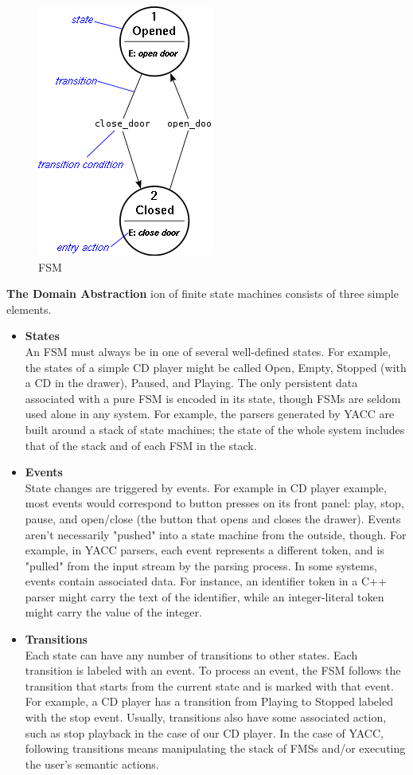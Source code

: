 \begin{figure}[htbp]
    \centering
    \includegraphics[scale=0.8]{images/fsm.png}
    \caption[FSM]{FSM}
\end{figure}

\textbf{The Domain Abstraction} ion of finite state machines consists of three simple elements.
\begin{itemize}
\item \textbf{States}\\
    An FSM must always be in one of several well-defined states. For example,
    the states of a simple CD player might be called Open, Empty, Stopped (with
    a CD in the drawer), Paused, and Playing. The only persistent data
    associated with a pure FSM is encoded in its state, though FSMs are seldom
    used alone in any system. For example, the parsers generated by YACC are
    built around a stack of state machines; the state of the whole system includes
    that of the stack and of each FSM in the stack.
\item \textbf{Events}\\
    State changes are triggered by events. For example in CD player example, most
    events would correspond to button presses on its front panel: play, stop,
    pause, and open/close (the button that opens and closes the drawer). Events
    aren't necessarily "pushed" into a state machine from the outside, though.
    For example, in YACC parsers, each event represents a different token, and
    is "pulled" from the input stream by the parsing process. In some systems,
    events contain associated data. For instance, an identifier token in a C++
    parser might carry the text of the identifier, while an integer-literal token
    might carry the value of the integer.
\item \textbf{Transitions}\\
    Each state can have any number of transitions to other states. Each transition
    is labeled with an event. To process an event, the FSM follows the transition
    that starts from the current state and is marked with that event. For example,
    a CD player has a transition from Playing to Stopped labeled with the stop
    event. Usually, transitions also have some associated action, such as stop
    playback in the case of our CD player. In the case of YACC, following
    transitions means manipulating the stack of FMSs and/or executing the user's
    semantic actions.
\end{itemize}

